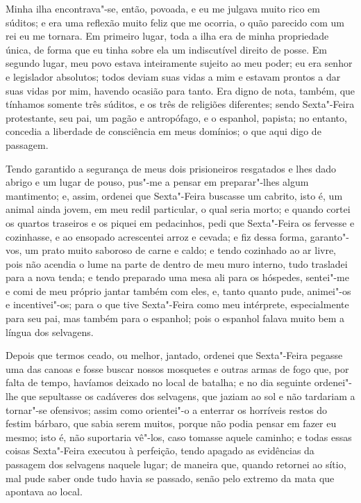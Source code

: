 Minha ilha encontrava"-se, então, povoada, e eu me julgava muito rico em
súditos; e era uma reflexão muito feliz que me ocorria, o quão parecido
com um rei eu me tornara. Em primeiro lugar, toda a ilha era de minha
propriedade única, de forma que eu tinha sobre ela um indiscutível
direito de posse. Em segundo lugar, meu povo estava inteiramente sujeito
ao meu poder; eu era senhor e legislador absolutos; todos deviam suas
vidas a mim e estavam prontos a dar suas vidas por mim, havendo ocasião
para tanto. Era digno de nota, também, que tínhamos somente três
súditos, e os três de religiões diferentes; sendo Sexta"-Feira
protestante, seu pai, um pagão e antropófago, e o espanhol, papista; no
entanto, concedia a liberdade de consciência em meus domínios; o que
aqui digo de passagem.

Tendo garantido a segurança de meus dois prisioneiros resgatados e lhes
dado abrigo e um lugar de pouso, pus"-me a pensar em preparar"-lhes algum
mantimento; e, assim, ordenei que Sexta"-Feira buscasse um cabrito, isto
é, um animal ainda jovem, em meu redil particular, o qual seria morto; e
quando cortei os quartos traseiros e os piquei em pedacinhos, pedi que
Sexta"-Feira os fervesse e cozinhasse, e ao ensopado acrescentei arroz e
cevada; e fiz dessa forma, garanto"-vos, um prato muito saboroso de carne
e caldo; e tendo cozinhado ao ar livre, pois não acendia o lume na parte
de dentro de meu muro interno, tudo trasladei para a nova tenda; e tendo
preparado uma mesa ali para os hóspedes, sentei"-me e comi de meu próprio
jantar também com eles, e, tanto quanto pude, animei"-os e incentivei"-os;
para o que tive Sexta"-Feira como meu intérprete, especialmente para seu
pai, mas também para o espanhol; pois o espanhol falava muito bem a
língua dos selvagens.

Depois que termos ceado, ou melhor, jantado, ordenei que Sexta"-Feira
pegasse uma das canoas e fosse buscar nossos mosquetes e outras armas de
fogo que, por falta de tempo, havíamos deixado no local de batalha; e no
dia seguinte ordenei"-lhe que sepultasse os cadáveres dos selvagens, que
jaziam ao sol e não tardariam a tornar"-se ofensivos; assim como
orientei"-o a enterrar os horríveis restos do festim bárbaro, que sabia
serem muitos, porque não podia pensar em fazer eu mesmo; isto é, não
suportaria vê"-los, caso tomasse aquele caminho; e todas essas coisas
Sexta"-Feira executou à perfeição, tendo apagado as evidências da
passagem dos selvagens naquele lugar; de maneira que, quando retornei ao
sítio, mal pude saber onde tudo havia se passado, senão pelo extremo da
mata que apontava ao local.

